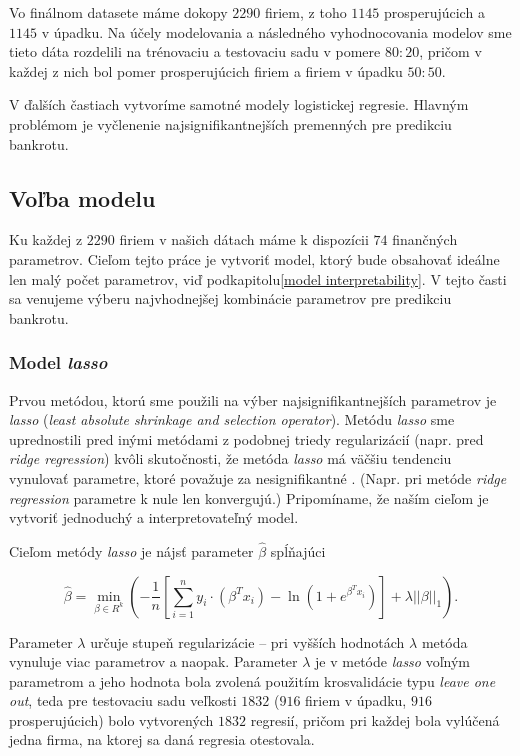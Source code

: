 Vo finálnom datasete máme dokopy \(2290\) firiem, z toho \(1145\) prosperujúcich a \(1145\) v úpadku.
Na účely modelovania a následného vyhodnocovania modelov sme tieto dáta rozdelili na trénovaciu a testovaciu sadu v pomere \(80:20\),
pričom v každej z nich bol pomer prosperujúcich firiem a firiem v úpadku \(50:50\).

V ďalších častiach vytvoríme samotné modely logistickej regresie. Hlavným problémom je vyčlenenie najsignifikantnejších premenných pre predikciu bankrotu.

\subsection{Voľba modelu}

Ku každej z \(2290\) firiem v našich dátach máme k dispozícii \(74\) finančných parametrov.
Cieľom tejto práce je vytvoriť model, ktorý bude obsahovať ideálne len malý počet parametrov, viď podkapitolu\autoref{model interpretability}.
V tejto časti sa venujeme výberu najvhodnejšej kombinácie parametrov pre predikciu bankrotu.

\subsubsection{Model \emph{lasso}}

Prvou metódou, ktorú sme použili na výber najsignifikantnejších parametrov je \emph{lasso} (\emph{least absolute shrinkage and selection operator}).
Metódu \emph{lasso} sme uprednostili pred inými metódami z podobnej triedy regularizácií (napr. pred \emph{ridge regression}) kvôli skutočnosti,
že metóda \emph{lasso} má väčšiu tendenciu vynulovať parametre, ktoré považuje za nesignifikantné \cite{glmnet}.
(Napr. pri metóde \emph{ridge regression} parametre k nule len konvergujú.)
Pripomíname, že naším cieľom je vytvoriť jednoduchý a interpretovateľný model.

Cieľom metódy \emph{lasso} je nájsť parameter \(\hat{\beta}\) spĺňajúci

\[
    \hat{\beta} = \min_{\beta \in R^k} \left( - \frac{1}{n} \left[ \sum_{i = 1}^n y_i \cdot (\beta^T x_i) - \ln{(1 + e^{\beta^T x_i})} \right] + \lambda || \beta ||_1 \right).
\]

Parameter \(\lambda\) určuje stupeň regularizácie – pri vyšších hodnotách \(\lambda\) metóda vynuluje viac parametrov a naopak.
Parameter \(\lambda\) je v metóde \emph{lasso} voľným parametrom a jeho hodnota bola zvolená použitím krosvalidácie typu \emph{leave one out},
teda pre testovaciu sadu veľkosti \(1832\) (\(916\) firiem v úpadku, \(916\) prosperujúcich) bolo vytvorených \(1832\) regresií,
pričom pri každej bola vylúčená jedna firma, na ktorej sa daná regresia otestovala.

